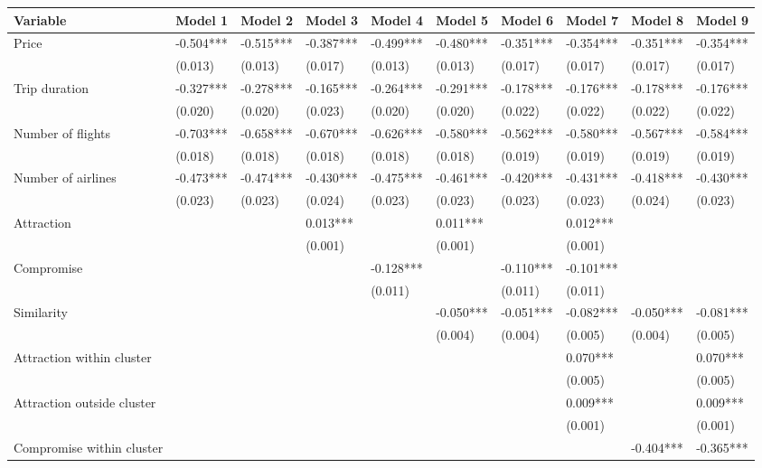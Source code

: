 \documentclass[a4paper,12pt]{article}
\begin{document}
\begin{table}
    \centering
    \scriptsize
    \begin{tabular}{p{5.3cm}*{9}{p{1.3cm}}}
    \toprule
    Variable & Model 1 & Model 2 & Model 3 & Model 4 & Model 5 & Model 6 & Model 7 & Model 8 & Model 9 \\
    \midrule
    Price & -0.504*** & -0.515*** & -0.387*** & -0.499*** & -0.480*** & -0.351*** & -0.354*** & -0.351*** & -0.354*** \\
    & (0.013) & (0.013) & (0.017) & (0.013) & (0.013) & (0.017) & (0.017) & (0.017) & (0.017) \\
    Trip duration & -0.327*** & -0.278*** & -0.165*** & -0.264*** & -0.291*** & -0.178*** & -0.176*** & -0.178*** & -0.176*** \\
    & (0.020) & (0.020) & (0.023) & (0.020) & (0.020) & (0.022) & (0.022) & (0.022) & (0.022) \\
    Number of flights & -0.703*** & -0.658*** & -0.670*** & -0.626*** & -0.580*** & -0.562*** & -0.580*** & -0.567*** & -0.584*** \\
    & (0.018) & (0.018) & (0.018) & (0.018) & (0.018) & (0.019) & (0.019) & (0.019) & (0.019) \\
    Number of airlines & -0.473*** & -0.474*** & -0.430*** & -0.475*** & -0.461*** & -0.420*** & -0.431*** & -0.418*** & -0.430*** \\
    & (0.023) & (0.023) & (0.024) & (0.023) & (0.023) & (0.023) & (0.023) & (0.024) & (0.023) \\
    Attraction & & & 0.013*** & & 0.011*** & & 0.012*** & & \\
    & & & (0.001) & & (0.001) & & (0.001) & & \\
    Compromise & & & & -0.128*** & & -0.110*** & -0.101*** & & \\
    & & & & (0.011) & & (0.011) & (0.011) & & \\
    Similarity & & & & & -0.050*** & -0.051*** & -0.082*** & -0.050*** & -0.081*** \\
    & & & & & (0.004) & (0.004) & (0.005) & (0.004) & (0.005) \\
    Attraction within cluster & & & & & & & 0.070*** & & 0.070*** \\
    & & & & & & & (0.005) & & (0.005) \\
    Attraction outside cluster & & & & & & & 0.009*** & & 0.009*** \\
    & & & & & & & (0.001) & & (0.001) \\
    Compromise within cluster & & & & & & & & -0.404*** & -0.365*** \\

\end{tabular}
\end{table}
\end{document}
